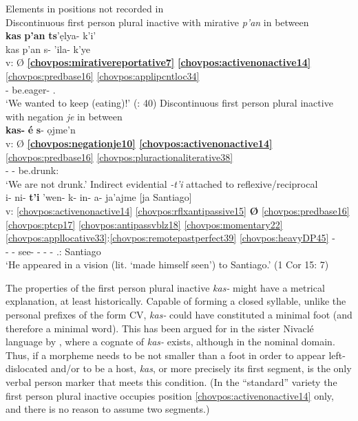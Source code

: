 \documentclass[output=paper]{langscibook}
\begin{document}
\ea\label{chor:ex:key:1}Elements in positions not recorded in  \\
    \ea  Discontinuous first person plural inactive with mirative \textit{p'an} in between\\ {
    {} \textbf{kas} \textbf{p'an} \textbf{ts}'ẹlya- k'i'\\  
    \glll {} kas p'an s- 'ila- k'ye \\ 
    v: Ø \textbf{\ref{chovpos:mirativereportative7}} \textbf{\ref{chovpos:activenonactive14}} \ref{chovpos:predbase16} \ref{chovpos:applipcntloc34}\\ 
    {} \First\Pl{} \Mir{} \First\Pl{}- be.eager- \Ap{}.\Distr{}\\
    \glt `We wanted to keep (eating)!' (\citealt{DraysonGomez2000}: 40)
    }
    \ex  Discontinuous first person plural inactive with negation \textit{je} in between\\ {
    \glll {} \textbf{kas-} \textbf{é} \textbf{s}-  ọjme'n\\
    v: Ø \textbf{\ref{chovpos:negationje10} \ref{chovpos:activenonactive14}} \ref{chovpos:predbase16} \ref{chovpos:pluractionaliterative38}\\ 
    {} \First\Pl{}- \Neg{} \First\Pl{}- be.drunk:\Jen{}\\ 
    \glt `We are not drunk.' \citep{Gerzenstein1983}
    }
    \ex  Indirect evidential \textit{-t'i} attached to reflexive/reciprocal \\ { 
    \glll {} i- ni- \textbf{t'i} 'wen- k- in- a- ja'ajme [ja Santiago]\\
    v: \ref{chovpos:activenonactive14} \ref{chovpos:rflxantipassive15} \textbf{{}Ø} \ref{chovpos:predbase16} \ref{chovpos:ptcp17} \ref{chovpos:antipassvblz18} \ref{chovpos:momentary22} \ref{chovpos:appllocative33}:\ref{chovpos:remotepastperfect39} \ref{chovpos:heavyDP45} - \\ 
    {} \Third{}- \Refl{}- \textbf{\Evid{}} see- \Pp{}- \Vblz{}- \Mom{}- \Ap.\Loc{}:\Prf{} \Dem{} Santiago\\
    \glt `He appeared in a vision (lit. `made himself seen') to Santiago.' (1 Cor 15: 7)
    }
    \z 
\z 

The properties of the first person plural inactive \textit{kas-} might have a metrical explanation, at least historically. Capable of forming a closed syllable, unlike the personal prefixes of the form CV, \textit{kas-} could have constituted a minimal foot (and therefore a minimal word). This has been argued for in the sister Nivaclé language by \citet[178--179]{Gutierrez2015}, where a cognate of \textit{kas-} exists, although in the nominal domain. Thus, if a morpheme needs to be not smaller than a foot in order to appear left-dislocated and/or to be a host, \textit{kas\-}, or more precisely its first segment, is the only verbal person marker that meets this condition. (In the ``standard'' variety the first person plural inactive occupies position \ref{chovpos:activenonactive14} only, and there is no reason to assume two segments.)
\end{document}
